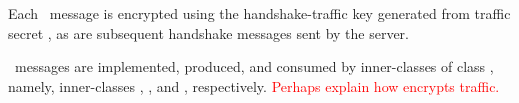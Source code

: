 \noindent
Each \EncryptedExtensions\ message is encrypted using the handshake-traffic key generated 
from traffic secret \TLSserverHandshakeTrafficSecret, as are subsequent 
handshake messages sent by the server.

\begin{tcolorbox}
\EncryptedExtensions\ messages are implemented, produced, and consumed by 
inner-classes of class , namely, inner-classes ,
, and , respectively.
\ifPresentationNotes
\textcolor{red}{Perhaps explain how  encrypts traffic.}
\fi
\end{tcolorbox}



